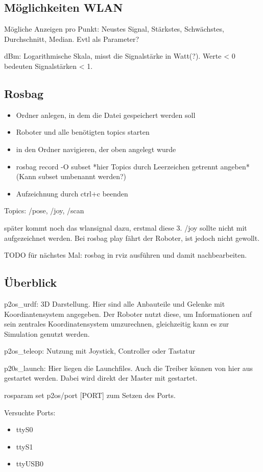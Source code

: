 \documentclass{scrartcl}%
\begin{document}
\subsection{Möglichkeiten WLAN}
Mögliche Anzeigen pro Punkt: Neustes Signal, Stärkstes, Schwächstes, Durchschnitt, Median. Evtl als Parameter?

dBm: Logarithmische Skala, misst die Signalstärke in Watt(?). Werte < 0 bedeuten Signalstärken < 1.

\subsection{Rosbag}
\begin{itemize}
	\item Ordner anlegen, in dem die Datei gespeichert werden soll
	\item Roboter und alle benötigten topics starten
	\item in den Ordner navigieren, der oben angelegt wurde
	\item rosbag record -O subset *hier Topics durch Leerzeichen getrennt angeben* (Kann subset umbenannt werden?)
	\item Aufzeichnung durch ctrl+c beenden
\end{itemize}
Topics: /pose, /joy, /scan

später kommt noch das wlansignal dazu, erstmal diese 3.
/joy sollte nicht mit aufgezeichnet werden. Bei rosbag play fährt der Roboter, ist jedoch nicht gewollt.

TODO für nächstes Mal: rosbag in rviz ausführen und damit nachbearbeiten.

\subsection{Überblick}
p2os\_urdf: 3D Darstellung. Hier sind alle Anbauteile und Gelenke mit Koordiantensystem angegeben. Der Roboter nutzt diese, um Informationen auf sein zentrales Koordinatensystem umzurechnen, gleichzeitig kann es zur Simulation genutzt werden.

p2os\_teleop: Nutzung mit Joystick, Controller oder Tastatur

p20s\_launch: Hier liegen die Launchfiles. Auch die Treiber können von hier aus gestartet werden. Dabei wird direkt der Master mit gestartet.

rosparam set p2os/port [PORT] zum Setzen des Ports.

Versuchte Ports: 
\begin{itemize}
	\item ttyS0
	\item ttyS1
	\item ttyUSB0
\end{itemize}
\end{document}
